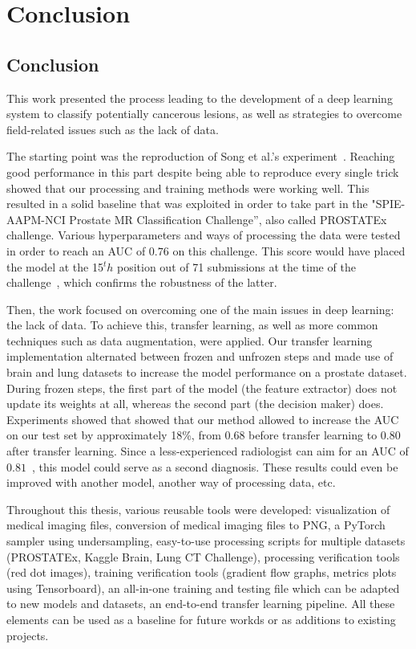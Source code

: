 
\chapter{Conclusion}
\label{ch:conclusions}

\section{Conclusion}
\setlength{\marginparwidth}{3cm}\leavevmode {}This work presented the process leading to the development of a deep learning system to classify potentially cancerous lesions, as well as strategies to overcome field-related issues such as the lack of data.

The starting point was the reproduction of Song et al.'s experiment~\cite{07}. Reaching good performance in this part despite being able to reproduce every single trick showed that our processing and training methods were working well. This resulted in a solid baseline that was exploited in order to take part in the "SPIE-AAPM-NCI Prostate MR Classification Challenge”, also called PROSTATEx challenge. Various hyperparameters and ways of processing the data were tested in order to reach an AUC of $0.76$ on this challenge. This score would have placed the model at the 15$^th$ position out of 71 submissions at the time of the challenge~\cite{42}, which confirms the robustness of the latter.

Then, the work focused on overcoming one of the main issues in deep learning: the lack of data. To achieve this, transfer learning, as well as more common techniques such as data augmentation, were applied. Our transfer learning implementation alternated between frozen and unfrozen steps and made use of brain and lung datasets to increase the model performance on a prostate dataset. During frozen steps, the first part of the model (the feature extractor) does not update its weights at all, whereas the second part (the decision maker) does. Experiments showed that showed that our method allowed to increase the AUC on our test set by approximately 18\%, from $0.68$ before transfer learning to $0.80$ after transfer learning. Since a less-experienced radiologist can aim for an AUC of $0.81$~\cite{42}, this model could serve as a second diagnosis. These results could even be improved with another model, another way of processing data, etc.

Throughout this thesis, various reusable tools were developed: visualization of medical imaging files, conversion of medical imaging files to PNG, a PyTorch sampler using undersampling, easy-to-use processing scripts for multiple datasets (PROSTATEx, Kaggle Brain, Lung CT Challenge), processing verification tools (red dot images), training verification tools (gradient flow graphs, metrics plots using Tensorboard), an all-in-one training and testing file which can be adapted to new models and datasets, an end-to-end transfer learning pipeline. All these elements can be used as a baseline for future workds or as additions to existing projects.


